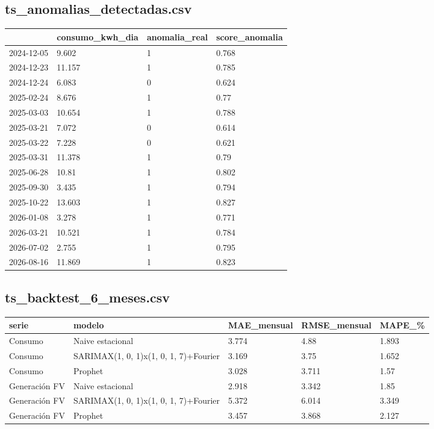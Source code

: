 \subsection*{ts\_anomalias\_detectadas.csv}
{\footnotesize\begin{longtable}{@{}llll@{}}
\toprule
 & consumo\_kwh\_dia & anomalia\_real & score\_anomalia \\
\midrule\endhead
2024-12-05 & 9.602 & 1 & 0.768 \\
2024-12-23 & 11.157 & 1 & 0.785 \\
2024-12-24 & 6.083 & 0 & 0.624 \\
2025-02-24 & 8.676 & 1 & 0.77 \\
2025-03-03 & 10.654 & 1 & 0.788 \\
2025-03-21 & 7.072 & 0 & 0.614 \\
2025-03-22 & 7.228 & 0 & 0.621 \\
2025-03-31 & 11.378 & 1 & 0.79 \\
2025-06-28 & 10.81 & 1 & 0.802 \\
2025-09-30 & 3.435 & 1 & 0.794 \\
2025-10-22 & 13.603 & 1 & 0.827 \\
2026-01-08 & 3.278 & 1 & 0.771 \\
2026-03-21 & 10.521 & 1 & 0.784 \\
2026-07-02 & 2.755 & 1 & 0.795 \\
2026-08-16 & 11.869 & 1 & 0.823 \\
\bottomrule
\end{longtable}}
\subsection*{ts\_backtest\_6\_meses.csv}
{\footnotesize\begin{longtable}{@{}lp{}lll@{}}
\toprule
serie & modelo & MAE\_mensual & RMSE\_mensual & MAPE\_\% \\
\midrule\endhead
Consumo & Naive estacional & 3.774 & 4.88 & 1.893 \\
Consumo & SARIMAX(1, 0, 1)x(1, 0, 1, 7)+Fourier & 3.169 & 3.75 & 1.652 \\
Consumo & Prophet & 3.028 & 3.711 & 1.57 \\
Generación FV & Naive estacional & 2.918 & 3.342 & 1.85 \\
Generación FV & SARIMAX(1, 0, 1)x(1, 0, 1, 7)+Fourier & 5.372 & 6.014 & 3.349 \\
Generación FV & Prophet & 3.457 & 3.868 & 2.127 \\
\bottomrule
\end{longtable}}
